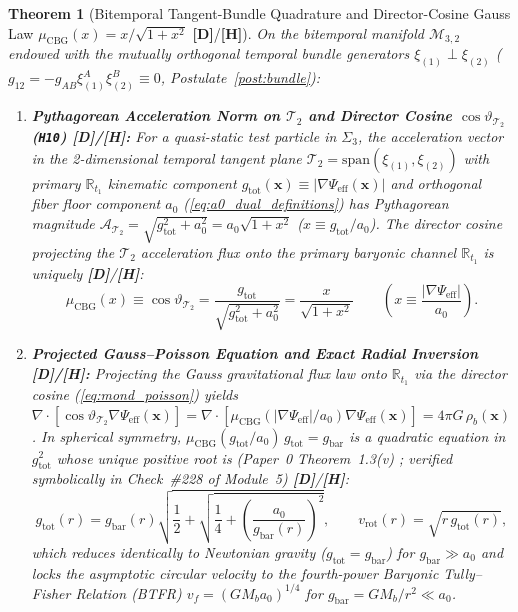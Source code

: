 \documentclass[11pt,a4paper]{article}
\newcommand{\catD}{\textbf{\textcolor{blue!75!black}{[D]}}}
\newcommand{\catH}{\textbf{\textcolor{orange!85!black}{[H]}}}
\newtheorem{theorem}{Theorem}[section]
\theoremstyle{definition}
\theoremstyle{remark}
\begin{document}
\begin{theorem}[Bitemporal Tangent-Bundle Quadrature and Director-Cosine Gauss Law $\mu_{\text{CBG}}(x) = x/\sqrt{1+x^2}$ \catD/\catH]
\label{hyp:milgrom_quadrature}
On the bitemporal manifold $\mathcal{M}_{3,2}$ endowed with the mutually orthogonal temporal bundle generators $\xi_{(1)} \perp \xi_{(2)}$ ($g_{12} = -g_{AB}\xi_{(1)}^A\xi_{(2)}^B \equiv 0$, Postulate~\ref{post:bundle}):
\begin{enumerate}
  \item[\textnormal{(i)}] \textbf{Pythagorean Acceleration Norm on $\mathcal{T}_2$ and Director Cosine $\cos\vartheta_{\mathcal{T}_2}$ (\texttt{H10}) \catD/\catH:} For a quasi-static test particle in $\Sigma_3$, the acceleration vector in the 2-dimensional temporal tangent plane $\mathcal{T}_2 = \text{span}(\xi_{(1)}, \xi_{(2)})$ with primary $\mathbb{R}_{t_1}$ kinematic component $g_{\text{tot}}(\mathbf{x}) \equiv |\nabla\Psi_{\text{eff}}(\mathbf{x})|$ and orthogonal fiber floor component $a_0$ (\ref{eq:a0_dual_definitions}) has Pythagorean magnitude $\mathcal{A}_{\mathcal{T}_2} = \sqrt{g_{\text{tot}}^2 + a_0^2} = a_0\sqrt{1 + x^2}$ ($x \equiv g_{\text{tot}}/a_0$). The director cosine projecting the $\mathcal{T}_2$ acceleration flux onto the primary baryonic channel $\mathbb{R}_{t_1}$ is uniquely \catD/\catH:
  \begin{equation}
    \mu_{\text{CBG}}(x) \equiv \cos\vartheta_{\mathcal{T}_2} = \frac{g_{\text{tot}}}{\sqrt{g_{\text{tot}}^2 + a_0^2}} = \frac{x}{\sqrt{1 + x^2}} \qquad \left(x \equiv \frac{|\nabla\Psi_{\text{eff}}|}{a_0}\right).
    \label{eq:mond_poisson}
  \end{equation}
  \item[\textnormal{(ii)}] \textbf{Projected Gauss--Poisson Equation and Exact Radial Inversion \catD/\catH:} Projecting the Gauss gravitational flux law onto $\mathbb{R}_{t_1}$ via the director cosine (\ref{eq:mond_poisson}) yields $\nabla\cdot[\cos\vartheta_{\mathcal{T}_2}\nabla\Psi_{\text{eff}}(\mathbf{x})] = \nabla\cdot[\mu_{\text{CBG}}(|\nabla\Psi_{\text{eff}}|/a_0)\nabla\Psi_{\text{eff}}(\mathbf{x})] = 4\pi G\,\rho_b(\mathbf{x})$. In spherical symmetry, $\mu_{\text{CBG}}(g_{\text{tot}}/a_0)\,g_{\text{tot}} = g_{\text{bar}}$ is a quadratic equation in $g_{\text{tot}}^2$ whose unique positive root is (Paper~0 Theorem~1.3(v) \cite{JV_Paper0}; verified symbolically in Check~\#228 of Module~5) \catD/\catH:
  \begin{equation}
    g_{\text{tot}}(r) = g_{\text{bar}}(r)\sqrt{\frac{1}{2} + \sqrt{\frac{1}{4} + \left(\frac{a_0}{g_{\text{bar}}(r)}\right)^2}}, \qquad v_{\text{rot}}(r) = \sqrt{r\,g_{\text{tot}}(r)},
    \label{eq:g_tot_sec9}
  \end{equation}
  which reduces identically to Newtonian gravity ($g_{\text{tot}} = g_{\text{bar}}$) for $g_{\text{bar}} \gg a_0$ and locks the asymptotic circular velocity to the fourth-power Baryonic Tully--Fisher Relation (BTFR) $v_f = (G M_b a_0)^{1/4}$ for $g_{\text{bar}} = GM_b/r^2 \ll a_0$.
\end{enumerate}
\end{theorem}
\end{document}
